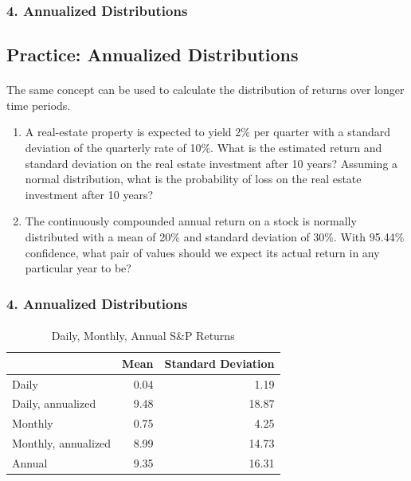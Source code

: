 \documentclass{beamer}
\begin{document}
\begin{practiceframe}[t]
    \frametitle{4. Annualized Distributions}
    \subsection{Practice: Annualized Distributions}
    \framesubtitle{}

    The same concept can be used to calculate the distribution of returns over longer time periods.
    \vspace{1em}

  \begin{enumerate}
  \setcounter{enumi}{0}
    \item A real-estate property is expected to yield 2\% per quarter with a 
    standard deviation of the quarterly rate of 10\%.  What is the estimated return and standard deviation on the real estate investment after 10 years?  Assuming a normal distribution, what is the probability of loss on the real estate investment after 10 years?
    \item The continuously compounded annual return on a stock is normally distributed with a mean of 20\% and standard deviation of 30\%.   With 95.44\% confidence, what pair of values should we expect its actual return in any particular year to be?
  \end{enumerate}

\end{practiceframe}

\begin{frame}[t]
    \frametitle{4. Annualized Distributions}
    \framesubtitle{}

    \begin{table}
        \caption{Daily, Monthly, Annual S\&P Returns}
        \begin{tabular}{lrr}
        \toprule
        &  Mean & Standard Deviation \\
        \midrule
        Daily & 0.04 & 1.19 \\
        Daily, annualized & 9.48 & 18.87 \\
        \midrule
        Monthly & 0.75 & 4.25 \\
        Monthly, annualized & 8.99 & 14.73 \\
        \midrule
        Annual & 9.35 & 16.31 \\
        \bottomrule
        \end{tabular}
    \end{table}

\end{frame}
\end{document}
